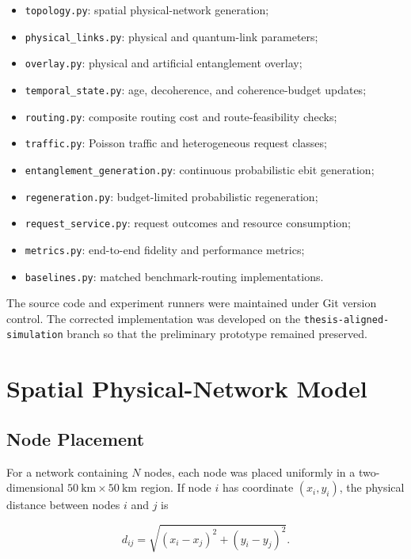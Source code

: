 \begin{itemize}
    \item \texttt{topology.py}: spatial physical-network generation;
    \item \texttt{physical\_links.py}: physical and quantum-link parameters;
    \item \texttt{overlay.py}: physical and artificial entanglement overlay;
    \item \texttt{temporal\_state.py}: age, decoherence, and coherence-budget updates;
    \item \texttt{routing.py}: composite routing cost and route-feasibility checks;
    \item \texttt{traffic.py}: Poisson traffic and heterogeneous request classes;
    \item \texttt{entanglement\_generation.py}: continuous probabilistic ebit generation;
    \item \texttt{regeneration.py}: budget-limited probabilistic regeneration;
    \item \texttt{request\_service.py}: request outcomes and resource consumption;
    \item \texttt{metrics.py}: end-to-end fidelity and performance metrics;
    \item \texttt{baselines.py}: matched benchmark-routing implementations.
\end{itemize}

The source code and experiment runners were maintained under Git version control.
The corrected implementation was developed on the
\texttt{thesis-aligned-simulation} branch so that the preliminary prototype
remained preserved.

\section{Spatial Physical-Network Model}

\subsection{Node Placement}

For a network containing \(N\) nodes, each node was placed uniformly in a
two-dimensional \(50~\mathrm{km}\times50~\mathrm{km}\) region. If node \(i\) has
coordinate \((x_i,y_i)\), the physical distance between nodes \(i\) and \(j\) is

\begin{equation}
d_{ij}
=
\sqrt{(x_i-x_j)^2+(y_i-y_j)^2}.
\end{equation}

